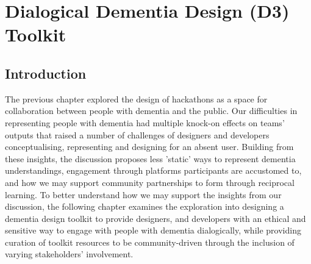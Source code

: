 \chapter{Dialogical Dementia Design (D3) Toolkit}
\label{D3}

\section{Introduction}
The previous chapter explored the design of hackathons as a space for collaboration between people with dementia and the public. Our difficulties in representing people with dementia had multiple knock-on effects on teams' outputs that raised a number of challenges of designers and developers conceptualising, representing and designing for an absent user. Building from these insights, the discussion proposes less 'static' ways to represent dementia understandings, engagement through platforms participants are accustomed to, and how we may support community partnerships to form through reciprocal learning. To better understand how we may support the insights from our discussion, the following chapter examines the exploration into designing a dementia design toolkit to provide designers, and developers with an ethical and sensitive way to engage with people with dementia dialogically, while providing curation of toolkit resources to be community-driven through the inclusion of varying stakeholders' involvement.

